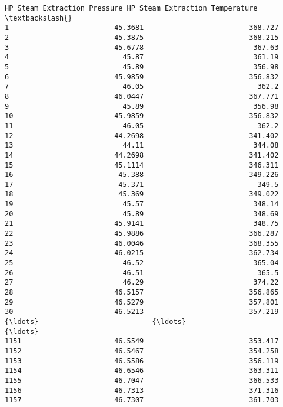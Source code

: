 \documentclass[11pt]{article}
\begin{document}
\begin{tcolorbox}[breakable, size=fbox, boxrule=.5pt, pad at break*=1mm, opacityfill=0]
\begin{Verbatim}[commandchars=\\\{\}]
     HP Steam Extraction Pressure HP Steam Extraction Temperature  \textbackslash{}
1                         45.3681                         368.727
2                         45.3875                         368.215
3                         45.6778                          367.63
4                           45.87                          361.19
5                           45.89                          356.98
6                         45.9859                         356.832
7                           46.05                           362.2
8                         46.0447                         367.771
9                           45.89                          356.98
10                        45.9859                         356.832
11                          46.05                           362.2
12                        44.2698                         341.402
13                          44.11                          344.08
14                        44.2698                         341.402
15                        45.1114                         346.311
16                         45.388                         349.226
17                         45.371                           349.5
18                         45.369                         349.022
19                          45.57                          348.14
20                          45.89                          348.69
21                        45.9141                          348.75
22                        45.9886                         366.287
23                        46.0046                         368.355
24                        46.0215                         362.734
25                          46.52                          365.04
26                          46.51                           365.5
27                          46.29                          374.22
28                        46.5157                         356.865
29                        46.5279                         357.801
30                        46.5213                         357.219
{\ldots}                           {\ldots}                             {\ldots}
1151                      46.5549                         353.417
1152                      46.5467                         354.258
1153                      46.5586                         356.119
1154                      46.6546                         363.311
1155                      46.7047                         366.533
1156                      46.7313                         371.316
1157                      46.7307                         361.703

\end{Verbatim}
\end{tcolorbox}
\end{document}
